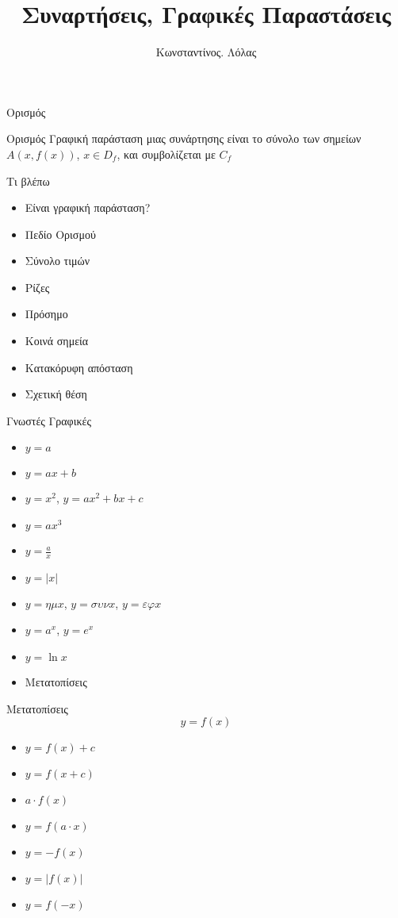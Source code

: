 \documentclass[greek]{beamer}
\title{Συναρτήσεις, Γραφικές Παραστάσεις}
\author[Λόλας]{Κωνσταντίνος. Λόλας}
\date{}
\begin{document}
\begin{frame}
 \titlepage
\end{frame}
\begin{frame}{Ορισμός}
 \begin{block}{Ορισμός}
  Γραφική παράσταση μιας συνάρτησης είναι το σύνολο των σημείων $A(x,f(x))$, $x\in D_f$, και συμβολίζεται με $C_f$
 \end{block}
\end{frame}

\begin{frame}{Τι βλέπω}
 \begin{itemize}
  \item<1-> Είναι γραφική παράσταση?
  \item<2-> Πεδίο Ορισμού
  \item<3-> Σύνολο τιμών
  \item<4-> Ρίζες
  \item<5-> Πρόσημο
  \item<6-> Κοινά σημεία
  \item<7-> Κατακόρυφη απόσταση
  \item<8-> Σχετική θέση
 \end{itemize}
\end{frame}

\begin{frame}{Γνωστές Γραφικές}
 \begin{itemize}
  \item<1-> $y=a$
  \item<2-> $y=ax+b$
  \item<3-> $y=x^2$, $y=ax^2+bx+c$
  \item<4-> $y=ax^3$
  \item<5-> $y=\frac{a}{x}$
  \item<6-> $y=|x|$
  \item<7-> $y=ημ x$, $y=συν x$, $y=εφ x$
  \item<8-> $y=a^x$, $y=e^x$
  \item<9-> $y=\ln x$
  \item<10-> Μετατοπίσεις
 \end{itemize}
\end{frame}

\begin{frame}{Μετατοπίσεις}
 $$y=f(x)$$
 \begin{itemize}
  \item<1-> $y=f(x)+c$
  \item<2-> $y=f(x+c)$
  \item<3-> $a\cdot f(x)$
  \item<4-> $y=f(a\cdot x)$
  \item<5-> $y=-f(x)$
  \item<6-> $y=|f(x)|$
  \item<7-> $y=f(-x)$
 \end{itemize}
\end{frame}
\end{document}
